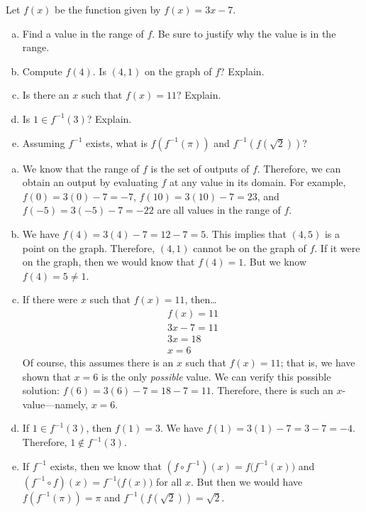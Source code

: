 \documentclass[11pt,letterpaper]{article}
\begin{document}
 Let $f(x)$ be the function given by $f(x)= 3x - 7$. 
	\begin{enumerate}[(a)]
	\item Find a value in the range of $f$. Be sure to justify why the value is in the range. 
	\item Compute $f(4)$. Is $(4, 1)$ on the graph of $f$? Explain. 
	\item Is there an $x$ such that $f(x)= 11$? Explain. 
	\item Is $1 \in f^{-1}(3)$? Explain. 
	\item Assuming $f^{-1}$ exists, what is $f(f^{-1}(\pi))$ and $f^{-1}(f(\sqrt{2}))$?
	\end{enumerate} \pspace

\sol 
{\itshape
\begin{enumerate}[(a)]
\item We know that the range of $f$ is the set of outputs of $f$. Therefore, we can obtain an output by evaluating $f$ at any value in its domain. For example, $f(0)= 3(0) - 7= -7$, $f(10)= 3(10) - 7= 23$, and $f(-5)= 3(-5) - 7= -22$ are all values in the range of $f$. \vfill

\item We have $f(4)= 3(4) - 7= 12 - 7= 5$. This implies that $(4, 5)$ is a point on the graph. Therefore, $(4, 1)$ cannot be on the graph of $f$. If it were on the graph, then we would know that $f(4)= 1$. But we know $f(4)= 5 \neq 1$. \vfill

\item If there were $x$ such that $f(x)= 11$, then\dots
	\[
	\begin{gathered}
	f(x)= 11 \\
	3x - 7= 11 \\
	3x= 18 \\
	x= 6
	\end{gathered}
	\]
Of course, this assumes there is an $x$ such that $f(x)= 11$; that is, we have shown that $x= 6$ is the only \textit{possible} value. We can verify this possible solution: $f(6)= 3(6) - 7= 18 - 7= 11$. Therefore, there is such an $x$-value---namely, $x= 6$. \vfill

\item If $1 \in f^{-1}(3)$, then $f(1)= 3$. We have $f(1)= 3(1) - 7= 3 - 7= -4$. Therefore, $1 \notin f^{-1}(3)$. \vfill

\item If $f^{-1}$ exists, then we know that $(f \circ f^{-1})(x)= f \big( f^{-1}(x) \big)$ and $(f^{-1} \circ f)(x)= f^{-1} \big( f(x) \big)$ for all $x$. But then we would have $f(f^{-1}(\pi))= \pi$ and $f^{-1}(f(\sqrt{2}))= \sqrt{2}$. \vfill
\end{enumerate}
}
\end{document}
